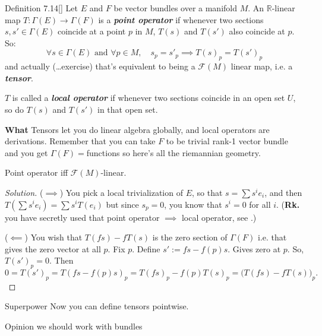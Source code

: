 \begin{thing4}{Definition 7.14}[\cite{tud}]\label{def:7.14}\leavevmode
Let \(E\) and \(F\) be vector bundles over a manifold \(M\). An \(\mathbb{R}\)-linear map \(T:\Gamma(E)\longrightarrow \Gamma(F)\) is a \textit{\textbf{point operator}} if whenever two sections \(s,s' \in \Gamma(E)\) coincide at a point \(p\) in \(M\), \(T(s)\) and \(T(s')\) also coincide at \(p\). So:
\[\forall s \in \Gamma(E)\text{ and } \forall  p \in M, \quad s_p=s'_p \implies T(s)_p=T(s')_p\]
and actually (…exercise) that's equivalent to being a \(\mathcal{F}(M)\) linear map, i.e. a \textit{\textbf{tensor}}.

\(T\) is called a \textit{\textbf{local operator}} if whenever two sections coincide in an open set \(U\), so do \(T(s)\) and  \(T(s')\) in that open set.

{\color{2}\bfseries What}\hspace{.5em} Tensors let you do linear algebra globally, and local operators are derivations. Remember that you can take \(F\) to be trivial rank-1 vector bundle and you get \(\Gamma(F)=\)functions so here's all the riemannian geometry.
\end{thing4}

\begin{exercise}\leavevmode
Point operator iff \(\mathcal{F}(M)\)-linear.
\end{exercise}

\begin{proof}[Solution]\leavevmode
(\(\implies\)) You pick a local trivialization of \(E\), so that \(s=\sum s^ie_i\), and then
\(T\left(\sum s^ie_i\right)=\sum s^i T(e_i)\) but since \(s_p=0\), you know that \(s^i=0\) for all \(i\). (\textbf{Rk.}  you have secretly used that point operator \(\implies\) local operator, see \cite{tud}.)

(\(\impliedby\)) You wish that \(T(fs)-fT(s)\) is the zero section of  \(\Gamma(F)\) i.e. that gives the zero vector at all \(p\). Fix \(p\). Define \(s':=fs - f(p)s\). Gives zero at \(p\). So, \(T(s')_p=0\). Then
 \[0=T(s')_p=T(fs-f(p)s)_p=T(fs)_p-f(p)T(s)_p=\Big(T(fs)-fT(s)\Big)_p.\]

\end{proof}

\begin{thing8}{Superpower}\leavevmode
Now you can define tensors pointwise.
\end{thing8}

\begin{thing6}{Opinion}\leavevmode
we should work with bundles
\end{thing6}

